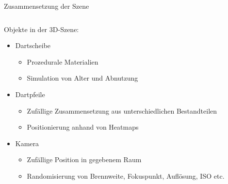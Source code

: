
\begin{frame}{Zusammensetzung der Szene}
    \begin{columns}
        \begin{column}{0.6\linewidth}

            Objekte in der 3D-Szene:
            \begin{itemize}\footnotesize
                \setlength\itemsep{0em}
                \item<2-> Dartscheibe
                      \vspace*{-0.1cm}
                      \begin{itemize}\footnotesize
                          \item Prozedurale Materialien
                          \item Simulation von Alter und Abnutzung
                      \end{itemize}
                      \vspace*{-0.15cm}
                \item<3-> Dartpfeile
                      \vspace*{-0.1cm}
                      \begin{itemize}\footnotesize
                          \item Zufällige Zusammensetzung aus unterschiedlichen Bestandteilen
                          \item Positionierung anhand von Heatmaps
                      \end{itemize}
                      \vspace*{-0.15cm}
                \item<4-> Kamera
                      \vspace*{-0.1cm}
                      \begin{itemize}\footnotesize
                          \item Zufällige Position in gegebenem Raum
                          \item Randomisierung von Brennweite, Fokuspunkt, Auflösung, ISO etc.
                      \end{itemize}

\end{itemize}
\end{column}
\end{columns}
\end{frame}
